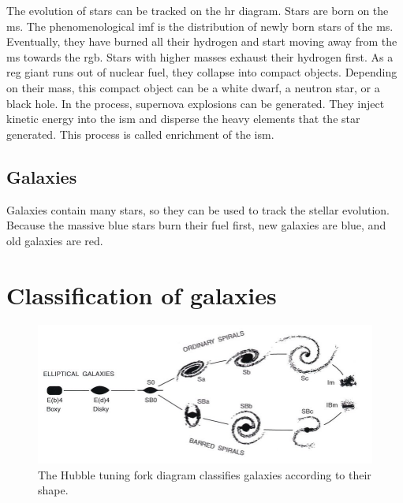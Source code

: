 The evolution of stars can be tracked on the \ac{hr} diagram.
Stars are born on the \ac{ms}.
The phenomenological \ac{imf} is the distribution of newly born stars of the \ac{ms}.
Eventually, they have burned all their hydrogen and start moving away from the \ac{ms} towards the \ac{rgb}.
Stars with higher masses exhaust their hydrogen first.
As a reg giant runs out of nuclear fuel, they collapse into compact objects. Depending on their mass, this compact object can be a white dwarf, a neutron star, or a black hole.
In the process, supernova explosions can be generated.
They inject kinetic energy into the \ac{ism} and disperse the heavy elements that the star generated.
This process is called enrichment of the \ac{ism}.

\subsection{Galaxies}
Galaxies contain many stars, so they can be used to track the stellar evolution.
Because the massive blue stars burn their fuel first, new galaxies are blue, and old galaxies are red.


\section{Classification of galaxies}

\begin{figure}
	\includegraphics[width=\textwidth]{img/ch-05/tuning-fork.jpg}
	\caption{The Hubble tuning fork diagram classifies galaxies according to their shape.}
	\label{fig:tuning-fork}
\end{figure}

